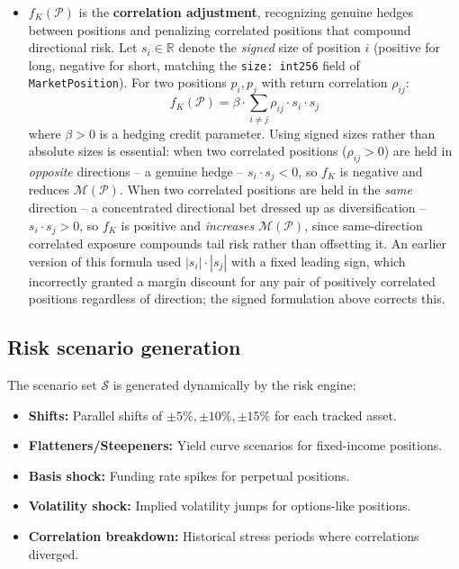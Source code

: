 \documentclass[11pt,a4paper]{article}
\begin{document}
\begin{itemize}
  \item $f_K(\mathcal{P})$ is the \textbf{correlation adjustment}, recognizing genuine hedges between positions and penalizing correlated positions that compound directional risk. Let $s_i \in \mathbb{R}$ denote the \emph{signed} size of position $i$ (positive for long, negative for short, matching the \texttt{size: int256} field of \texttt{MarketPosition}). For two positions $p_i, p_j$ with return correlation $\rho_{ij}$:
  \[
  f_K(\mathcal{P}) = \beta \cdot \sum_{i \neq j} \rho_{ij} \cdot s_i \cdot s_j
  \]
  where $\beta > 0$ is a hedging credit parameter. Using signed sizes rather than absolute sizes is essential: when two correlated positions ($\rho_{ij} > 0$) are held in \emph{opposite} directions -- a genuine hedge -- $s_i \cdot s_j < 0$, so $f_K$ is negative and reduces $\mathcal{M}(\mathcal{P})$. When two correlated positions are held in the \emph{same} direction -- a concentrated directional bet dressed up as diversification -- $s_i \cdot s_j > 0$, so $f_K$ is positive and \emph{increases} $\mathcal{M}(\mathcal{P})$, since same-direction correlated exposure compounds tail risk rather than offsetting it. An earlier version of this formula used $|s_i| \cdot |s_j|$ with a fixed leading sign, which incorrectly granted a margin discount for any pair of positively correlated positions regardless of direction; the signed formulation above corrects this.
\end{itemize}

\subsection{Risk scenario generation}

The scenario set $\mathcal{S}$ is generated dynamically by the risk engine:

\begin{itemize}
  \item \textbf{Shifts:} Parallel shifts of $ \pm 5\%, \pm 10\%, \pm 15\%$ for each tracked asset.
  \item \textbf{Flatteners/Steepeners:} Yield curve scenarios for fixed-income positions.
  \item \textbf{Basis shock:} Funding rate spikes for perpetual positions.
  \item \textbf{Volatility shock:} Implied volatility jumps for options-like positions.
  \item \textbf{Correlation breakdown:} Historical stress periods where correlations diverged.
\end{itemize}
\end{document}

